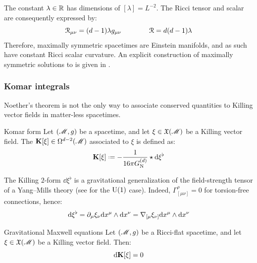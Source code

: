 The constant $ \lambda \in \mathbb{R} $ has dimensions of $ [\lambda] = L^{-2} $. The Ricci tensor and scalar are consequently expressed by:
\begin{equation}
  \EuScript{R}_{\mu \nu} = (d-1) \lambda g_{\mu \nu}
  \qquad \qquad
  \EuScript{R} = d(d-1) \lambda
\end{equation}
Therefore, maximally symmetric spacetimes are Einstein manifolds, and as such have constant Ricci scalar curvature. An explicit construction of maximally symmetric solutions to  is given in .

\subsubsection{Komar integrals}
\label{sssec:komar}

Noether's theorem is not the only way to associate conserved quantities to Killing vector fields in matter-less spacetimes.

\begin{definition}{Komar form}{}
  Let $ (\mathscr{M} , g) $ be a spacetime, and let $ \xi \in \mathfrak{X}(\mathscr{M}) $ be a Killing vector field. The  $ \mathbf{K}[\xi] \in \Omega^{d-2}(\mathscr{M}) $ associated to $ \xi $ is defined as:
  \begin{equation}
    \ve{K}[\xi] \defeq - \frac{1}{16 \pi \gd} \star \dd \xi^\flat
    \label{eq:komar-form}
  \end{equation}
\end{definition}

The Killing $ 2 $-form $ \dd \xi^\flat $ is a gravitational generalization of the field-strength tensor of a Yang--Mills theory (see  for the $ \mathrm{U}(1) $ case). Indeed, $ \Gamma^\rho_{[\mu \nu]} = 0 $ for torsion-free connections, hence:
\begin{equation*}
  \mathrm{d} \xi^\flat = \partial_\mu \xi_\nu \mathrm{d} x^\mu \wedge \mathrm{d} x^\nu = \nabla_{[\mu} \xi_{\nu]} \mathrm{d} x^\mu \wedge \mathrm{d} x^\nu
\end{equation*}

\begin{theorem}{Gravitational Maxwell equations}{}
  Let $ (\mathscr{M} , g) $ be a Ricci-flat spacetime, and let $ \xi \in \mathfrak{X}(\mathscr{M}) $ be a Killing vector field. Then:
  \begin{equation}
    \mathrm{d} \mathbf{K}[\xi] = 0
  \end{equation}
\end{theorem}


